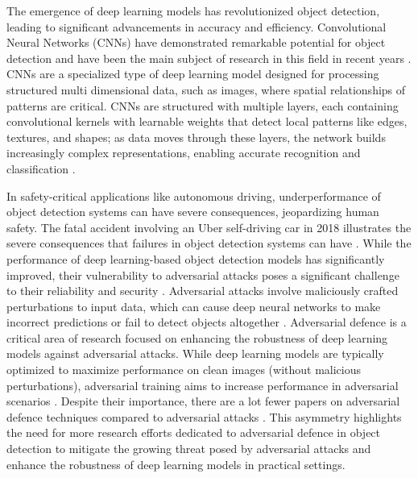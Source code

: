 \documentclass[journal,onecolumn,12pt]{IEEEtran}
\begin{document}
The emergence of deep learning models has revolutionized object detection, leading to significant advancements in accuracy and efficiency. Convolutional Neural Networks (CNNs) have demonstrated remarkable potential for object detection and have been the main subject of research in this field in recent years \cite{zou2023object}. CNNs are a specialized type of deep learning model designed for processing structured multi dimensional data, such as images, where spatial relationships of patterns are critical. CNNs are structured with multiple layers, each containing convolutional kernels with learnable weights that detect local patterns like edges, textures, and shapes; as data moves through these layers, the network builds increasingly complex representations, enabling accurate recognition and classification \cite{electronics10202470}.

In safety-critical applications like autonomous driving, underperformance of object detection systems can have severe consequences, jeopardizing human safety. The fatal accident involving an Uber self-driving car in 2018 illustrates the severe consequences that failures in object detection systems can have \cite{Kohli_2019}. While the performance of deep learning-based object detection models has significantly improved, their vulnerability to adversarial attacks poses a significant challenge to their reliability and security \cite{zhang2019adversarially}. Adversarial attacks involve maliciously crafted perturbations to input data, which can cause deep neural networks to make incorrect predictions or fail to detect objects altogether \cite{li2019rosa}. Adversarial defence is a critical area of research focused on enhancing the robustness of deep learning models against adversarial attacks. While deep learning models are typically optimized to maximize performance on clean images (without malicious perturbations), adversarial training aims to increase performance in adversarial scenarios \cite{costa2023deep}. Despite their importance, there are a lot fewer papers on adversarial defence techniques compared to adversarial attacks \cite{bai2021recent}. This asymmetry highlights the need for more research efforts dedicated to adversarial defence in object detection to mitigate the growing threat posed by adversarial attacks and enhance the robustness of deep learning models in practical settings.
\end{document}

